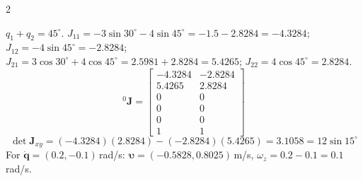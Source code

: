 \begin{multicols}{2}
\begin{fbx}
\begin{symbols}
\end{symbols}
\end{fbx}
\begin{worked}[notebook Question 1: $L_1=3$ m, $L_2=4$ m, $q_1=30^\circ$, $q_2=15^\circ$ (angles in degrees)]
$q_1+q_2=45^\circ$. $J_{11}=-3\sin30^\circ-4\sin45^\circ=-1.5-2.8284=-4.3284$; $J_{12}=-4\sin45^\circ=-2.8284$; $J_{21}=3\cos30^\circ+4\cos45^\circ=2.5981+2.8284=5.4265$; $J_{22}=4\cos45^\circ=2.8284$.
\[{}^0\mathbf J=\begin{bmatrix}-4.3284&-2.8284\\5.4265&2.8284\\0&0\\0&0\\0&0\\1&1\end{bmatrix}\]
\[\det\mathbf J_{xy}=(-4.3284)(2.8284)-(-2.8284)(5.4265)=3.1058=12\sin15^\circ\]
For $\dot{\mathbf q}=(0.2,-0.1)$\,rad/s: $\boldsymbol\upsilon=(-0.5828,0.8025)$\,m/s, $\omega_z=0.2-0.1=0.1$\,rad/s. \chk
\end{worked}


\end{multicols}
